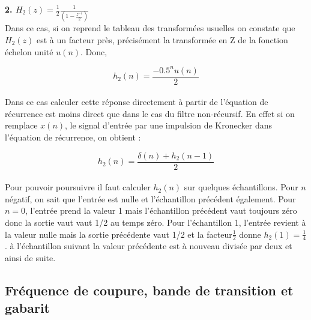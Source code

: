 \documentclass[11pt,a4paper]{article}
\begin{document}
\textbf{2. $H_2(z) = \frac{1}{2}\frac{1}{(1 - \frac{z^{-1}}{2})}$}\\

Dans ce cas, si on reprend le tableau des transformées usuelles on constate que $H_2(z)$ est à un facteur près, précisément la transformée en Z de la fonction échelon unité $u(n)$. Donc, 

\[h_2(n) = \frac{-0.5^n u(n)}{2}\]\\

Dans ce cas calculer cette réponse directement à partir de l'équation de récurrence est moins direct que dans le cas du filtre non-récursif. En effet si on remplace $x(n)$, le signal d'entrée par une impulsion de Kronecker dans l'équation de récurrence, on obtient :

\[h_2(n) = \frac{\delta(n) + h_2(n-1)}{2}\]\\

Pour pouvoir poursuivre il faut calculer $h_2(n)$ sur quelques échantillons. Pour $n$ négatif, on sait que l'entrée est nulle et l'échantillon précédent également. Pour $n=0$, l'entrée prend la valeur 1 mais l'échantillon précédent vaut toujours zéro donc la sortie vaut vaut 1/2 au temps zéro. Pour l'échantillon 1, l'entrée revient à la valeur nulle mais la sortie précédente vaut 1/2 et la facteur$ \frac{1}{2}$ donne $h_2(1) = \frac{1}{4}$. à l'échantillon suivant la valeur précédente est à nouveau divisée par deux et ainsi de suite.

\begin{center}
\end{center}

\subsection{Fréquence de coupure, bande de transition et gabarit}
\end{document}
